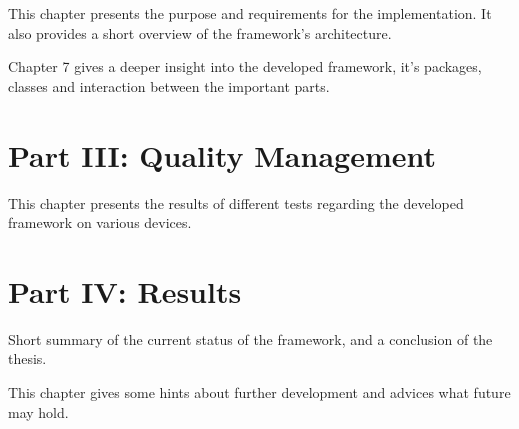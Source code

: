   \vspace{1mm}

\noindent  This chapter presents the purpose and requirements for the implementation. It also provides a short overview of the framework's architecture. \\

  \vspace{1mm}

\noindent  Chapter 7 gives a deeper insight into the developed framework, it's packages, classes and interaction between the important parts. \\

\section*{Part III: Quality Management}

  \vspace{1mm}

\noindent  This chapter presents the results of different tests regarding the developed framework on various devices. \\

\section*{Part IV: Results}

  \vspace{1mm}

\noindent  Short summary of the current status of the framework, and a conclusion of the thesis. \\

  \vspace{1mm}

\noindent  This chapter gives some hints about further development and advices what future may hold. \\

